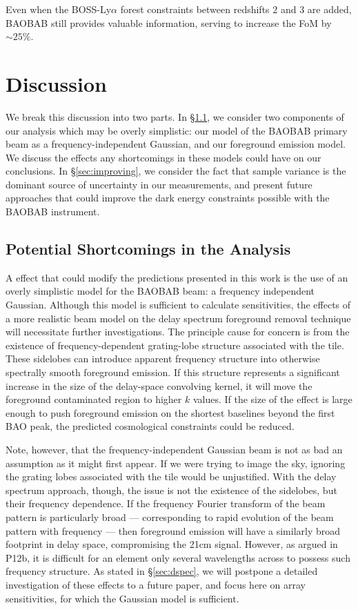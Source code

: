\documentclass[10pt,iop]{emulateapj}
\begin{document}
Even when the BOSS-Ly$\alpha$ forest constraints between redshifts 2 and 3 are 
added, BAOBAB still provides valuable information, serving to increase the FoM by $\sim 25\%$.

\section{Discussion}
\label{sec:discussion}

We break this discussion into two parts.  In \S\ref{sec:shortcomings}, we consider two 
components of our analysis which may be overly simplistic: our model of the BAOBAB primary
beam as a frequency-independent Gaussian, and our foreground emission model.  We discuss the effects 
any shortcomings in these models could have on our conclusions. In \S\ref{sec:improving},
we consider the fact that sample variance is the dominant source of uncertainty in our
measurements, and present future approaches that could improve the dark energy constraints possible 
with the BAOBAB instrument.

\subsection{Potential Shortcomings in the Analysis}
\label{sec:shortcomings}
A effect that could modify the predictions presented in this
work is the use of an overly simplistic model for the BAOBAB beam: a frequency independent
Gaussian.  Although this model is sufficient to calculate sensitivities, the effects of
a more realistic beam model on the delay spectrum foreground removal technique will necessitate
further investigations.  The principle cause for concern is from the existence of frequency-dependent
grating-lobe structure associated with the tile.  These sidelobes can introduce apparent 
frequency structure into otherwise spectrally
smooth foreground emission.  If this structure represents a significant increase in the size
of the delay-space convolving kernel, it will move the foreground contaminated region to higher $k$ values.  If the size of the effect is
large enough to push foreground emission on the shortest baselines beyond the first BAO peak,
the predicted cosmological constraints could be reduced.

Note, however, that the frequency-independent Gaussian beam is not as bad an assumption as it
might first appear.  If we were trying to image the sky, ignoring the grating lobes associated with
the tile would be unjustified.  With the delay spectrum approach, though, the issue is not
the existence of the sidelobes, but their frequency dependence.  If the frequency Fourier transform
of the beam pattern is particularly broad --- corresponding to rapid evolution of the beam pattern
with frequency --- then foreground emission will have a similarly broad footprint in delay space,
compromising the 21cm signal.  However, as argued in P12b, it is difficult for an element
only several wavelengths across to possess such frequency structure.  As stated in \S\ref{sec:dspec},
we will postpone a detailed investigation of these effects to a future paper, and focus here
on array sensitivities, for which the Gaussian model is sufficient.
\end{document}
